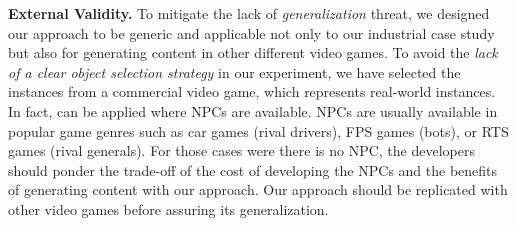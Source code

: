 \noindent \textbf{External Validity.}
To mitigate the lack of \textit{generalization} threat, we designed our approach to be generic and applicable not only to our industrial case study but also for generating content in other different video games. 
To avoid the \textit{lack of a clear object selection strategy} in our experiment, we have selected the instances from a commercial video game, which represents real-world instances.
In fact, \ApproachName{} can be applied where NPCs are available. NPCs are usually available in popular game genres such as car games (rival drivers), FPS games (bots), or RTS games (rival generals). For those cases were there is no NPC, the developers should ponder the trade-off of the cost of developing the NPCs and the benefits of generating content with our approach. Our approach should be replicated with other video games before assuring its generalization.


